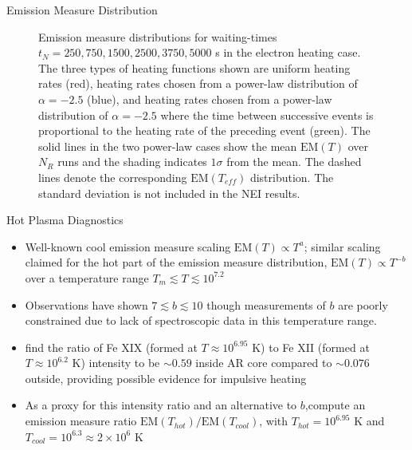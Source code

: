 \documentclass[final]{beamer}
\begin{document}
\begin{frame}
\begin{columns}[t]
\begin{column}{0.49\linewidth}
\begin{block}{Emission Measure Distribution}
\begin{figure}
{        \label{fig:electron_em}}
        \caption{Emission measure distributions for waiting-times $t_N=250,750,1500,2500,3750,5000$ s in the electron heating case. The three types of heating functions shown are uniform heating rates (red), heating rates chosen from a power-law distribution of $\alpha=-2.5$ (blue), and heating rates chosen from a power-law distribution of $\alpha=-2.5$ where the time between successive events is proportional to the heating rate of the preceding event (green). The solid lines in the two power-law cases show the mean $\mathrm{EM}(T)$ over $N_R$ runs and the shading indicates $1\sigma$ from the mean. The dashed lines denote the corresponding $\mathrm{EM}(T_{eff})$ distribution. The standard deviation is not included in the NEI results.}
      \end{figure}
      \vspace{-2ex}
    \end{block}
    \begin{block}{Hot Plasma Diagnostics}
      \vspace{-1ex}
      \begin{itemize}
        \item Well-known cool emission measure scaling $\mathrm{EM}(T)\propto T^a$;  similar scaling claimed for the hot part of the emission measure distribution, $\mathrm{EM}(T)\propto T^{-b}$ over a temperature range $T_m\lesssim T\lesssim10^{7.2}$
        \item Observations have shown $7\lesssim b\lesssim10$ \citep{warren_systematic_2012} though measurements of $b$ are poorly constrained due to lack of spectroscopic data in this temperature range.
        \item \citet{brosius_pervasive_2014} find the ratio of Fe XIX (formed at $T\approx10^{6.95}$ K) to Fe XII (formed at $T\approx10^{6.2}$ K) intensity to be $\sim0.59$ inside AR core compared to $\sim0.076$ outside, providing possible evidence for impulsive heating
        \item As a proxy for this intensity ratio and an alternative to $b$,compute an emission measure ratio $\mathrm{EM}(T_{hot})/\mathrm{EM}(T_{cool})$, with $T_{hot}=10^{6.95}$ K and $T_{cool}=10^{6.3}\approx2\times10^6$ K
      \end{itemize}
      \vspace{-2ex}
      \begin{figure}
        \centering
\end{figure}
\end{block}
\end{column}
\end{columns}
\end{frame}
\end{document}
